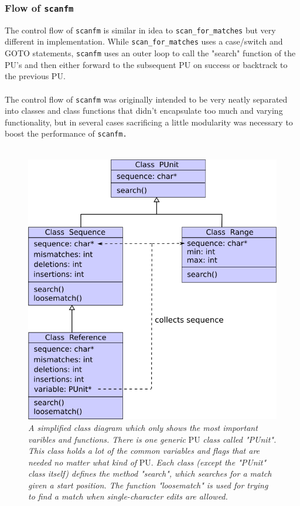 \documentclass[12pt]{article}
\newcommand{\scm}{\texttt{scan\_for\_matches} }
\newcommand{\sfm}{\texttt{scanfm} }
\newcommand{\sfmp}{\texttt{scanfm.}}
\newcommand{\pu}{PU }
\newcommand{\pus}{PU's }
\newcommand{\pup}{PU. }
\begin{document}
\subsubsection{Flow of \sfm}
The control flow of \sfm is similar in idea to \scm but very different in implementation. While \scm uses a case/switch
and GOTO statements, \sfm uses an outer loop to call the "search" function of the \pus and then either
forward to the subsequent \pu on success or backtrack to the previous \pup \\ \\
The control flow of \sfm was originally intended to be very neatly separated into classes and class functions that
didn't encapsulate too much and varying functionality, but in several cases sacrificing a little modularity
was necessary to boost the performance of \sfmp \\ \\
\begin{figure}[H]
\begin{center}
\includegraphics[scale=0.65]{Diagrams/classdia.png}
\end{center}
\caption{\textit{A simplified class diagram which only shows the most important varibles and functions.
There is one generic} \pu \textit{class called "PUnit". This class holds a lot of the common variables
and flags that are needed no matter what kind of} \pup
\textit{
Each class (except the "PUnit" class itself) defines the method "search", which searches for a match given a start position. 
The function "loosematch" is used for trying to find a match when single-character edits are allowed.}}
\end{figure}
\end{document}
